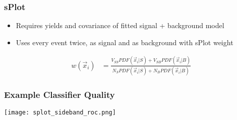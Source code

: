 \begin{frame}
    \frametitle{sPlot}
    \begin{center}
        \begin{itemize}
            \item Requires yields and covariance of fitted signal + background model
            \item Uses every event twice, as signal and as background with sPlot weight
        \end{itemize}
        \vspace{-1em}


        \begin{align*}
          w(\vec{x}_i) &= \frac{ V_{SS} PDF(\vec{x}_i | S) +  V_{SB} PDF(\vec{x}_i | B)} {N_S  PDF(\vec{x}_i | S) +  N_{B} PDF(\vec{x}_i | B)}
        \end{align*}
        \vspace{-1em}


    \end{center}
\end{frame}

\begin{frame}
    \frametitle{Example Classifier Quality}
    \begin{center}
        \texttt{[image: splot\_sideband\_roc.png]}
    \end{center}
\end{frame}

